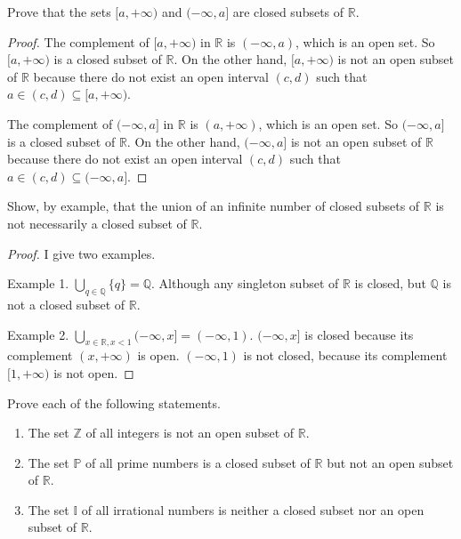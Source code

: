 \begin{exercise}
    Prove that the sets $[a, +\infty)$ and $(-\infty, a]$ are closed subsets of $\mathbb{R}$.
\end{exercise}

\begin{proof}
    The complement of $[a, +\infty)$ in $\mathbb{R}$ is $(-\infty, a)$, which is an open set. So $[a, +\infty)$ is a closed subset of $\mathbb{R}$. On the other hand, $[a, +\infty)$ is not an open subset of $\mathbb{R}$ because there do not exist an open interval $(c, d)$ such that $a\in (c, d)\subseteq [a, +\infty)$.

                                        The complement of $(-\infty, a]$ in $\mathbb{R}$ is $(a, +\infty)$, which is an open set. So $(-\infty, a]$ is a closed subset of $\mathbb{R}$. On the other hand, $(-\infty, a]$ is not an open subset of $\mathbb{R}$ because there do not exist an open interval $(c, d)$ such that $a\in (c, d)\subseteq (-\infty, a]$.
\end{proof}
\newpage

\begin{exercise}
    Show, by example, that the union of an infinite number of closed subsets of $\mathbb{R}$ is not necessarily a closed subset of $\mathbb{R}$.
\end{exercise}

\begin{proof}
    I give two examples.

    Example 1. $\bigcup_{q\in\mathbb{Q}} \{ q \} = \mathbb{Q}$. Although any singleton subset of $\mathbb{R}$ is closed, but $\mathbb{Q}$ is not a closed subset of $\mathbb{R}$.

    Example 2. $\bigcup_{x\in\mathbb{R}, x < 1} (-\infty, x] = (-\infty, 1)$. $(-\infty, x]$ is closed because its complement $(x, +\infty)$ is open. $(-\infty, 1)$ is not closed, because its complement $[1, +\infty)$ is not open.
\end{proof}
\newpage

\begin{exercise}
    Prove each of the following statements.
    \begin{enumerate}[label={(\roman*)}]
        \item The set $\mathbb{Z}$ of all integers is not an open subset of $\mathbb{R}$.
        \item The set $\mathbb{P}$ of all prime numbers is a closed subset of $\mathbb{R}$ but not an open subset of $\mathbb{R}$.
        \item The set $\mathbb{I}$ of all irrational numbers is neither a closed subset nor an open subset of $\mathbb{R}$.
    \end{enumerate}
\end{exercise}

